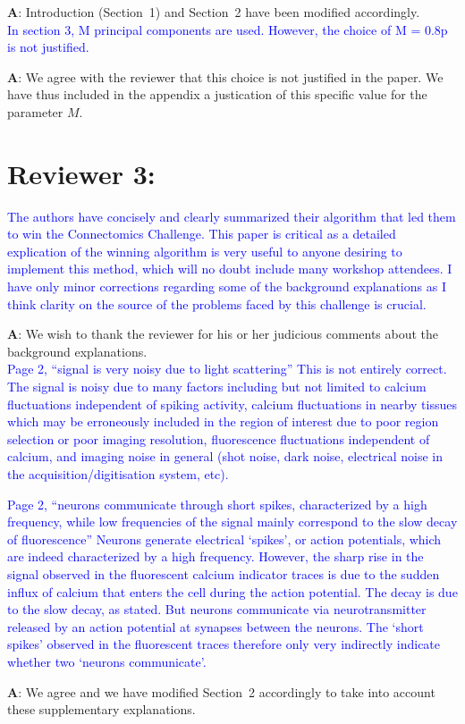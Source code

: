 \documentclass[wcp]{jmlr}
\begin{document}
\textbf{A}: Introduction (Section~1) and Section~2 have been modified accordingly.\\

\noindent
\textcolor{blue}{In section 3, M principal components are used. However, the choice of M = 0.8p is not justified.}

\textbf{A}: We agree with the reviewer that this choice is not justified in the paper. We have thus included in the appendix a justication of this specific value for the parameter $M$.



\section*{Reviewer 3:}


\textcolor{blue}{The authors have concisely and clearly summarized their algorithm that led them to win the Connectomics Challenge. This paper is critical as a detailed explication of the winning algorithm is very useful to anyone desiring to implement this method, which will no doubt include many workshop attendees.  I have only minor corrections regarding some of the background explanations as I think clarity on the source of the problems faced by this challenge is crucial.}

\textbf{A}: We wish to thank the reviewer for his or her judicious comments about the background explanations.\\

\noindent
\textcolor{blue}{Page 2, “signal is very noisy due to light scattering”  This is not entirely correct.  The signal is noisy due to many factors including but not limited to calcium fluctuations independent of spiking activity, calcium fluctuations in nearby tissues which may be erroneously included in the region of interest due to poor region selection or poor imaging resolution, fluorescence fluctuations independent of calcium, and imaging noise in general (shot noise, dark noise,  electrical noise in the acquisition/digitisation system, etc).}

\noindent
\textcolor{blue}{Page 2, “neurons communicate through short spikes, characterized by a high frequency, while low frequencies of the signal mainly correspond to the slow decay of fluorescence”  Neurons generate electrical ‘spikes’, or action potentials, which are indeed characterized by a high frequency. However, the sharp rise in the signal observed in the fluorescent calcium indicator traces is due to the sudden influx of calcium that enters the cell during the action potential.  The decay is due to the slow decay, as stated.  But neurons communicate via neurotransmitter released by an action potential at synapses between the neurons. The ‘short spikes’ observed in the fluorescent traces therefore only very indirectly indicate whether two ‘neurons communicate’.}

\textbf{A}: We agree and we have modified Section~2 accordingly to take into account these supplementary explanations.\\
\end{document}
